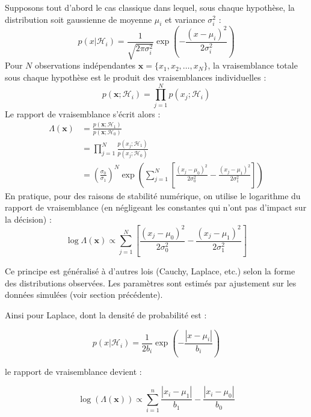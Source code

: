 \documentclass{article}
\begin{document}
Supposons tout d'abord le cas classique dans lequel, sous chaque hypothèse, la distribution soit gaussienne de moyenne $\mu_i$ et variance $\sigma_i^2$ :
\begin{equation}
    p(x|\mathcal{H}_i) = \frac{1}{\sqrt{2\pi\sigma_i^2}} \exp\left(-\frac{(x-\mu_i)^2}{2\sigma_i^2}\right)
\end{equation}
Pour $N$ observations indépendantes $\mathbf{x} = \{x_1, x_2, \ldots, x_N\}$, la vraisemblance totale sous chaque hypothèse est le produit des vraisemblances individuelles :
\begin{equation}
    p(\mathbf{x};\mathcal{H}_i) = \prod_{j=1}^N p(x_j;\mathcal{H}_i)
\end{equation}
Le rapport de vraisemblance s'écrit alors :
\begin{align}
    \Lambda(\mathbf{x}) &= \frac{p(\mathbf{x};\mathcal{H}_1)}{p(\mathbf{x};\mathcal{H}_0)} \\
    &= \prod_{j=1}^N \frac{p(x_j;\mathcal{H}_1)}{p(x_j;\mathcal{H}_0)} \\
    &= \left(\frac{\sigma_0}{\sigma_1}\right)^N \exp\left( \sum_{j=1}^N \left[ \frac{(x_j-\mu_0)^2}{2\sigma_0^2} - \frac{(x_j-\mu_1)^2}{2\sigma_1^2} \right] \right)
\end{align}
En pratique, pour des raisons de stabilité numérique, on utilise le logarithme du rapport de vraisemblance (en négligeant les constantes qui n'ont pas d'impact sur la décision) :
\begin{equation}
    \log \Lambda(\mathbf{x}) \propto \sum_{j=1}^N \left[ \frac{(x_j-\mu_0)^2}{2\sigma_0^2} - \frac{(x_j-\mu_1)^2}{2\sigma_1^2} \right]
\end{equation}

Ce principe est généralisé à d'autres lois (Cauchy, Laplace, etc.) selon la forme des distributions observées. Les paramètres sont estimés par ajustement sur les données simulées (voir section précédente).

Ainsi pour Laplace, dont la densité de probabilité est :

\begin{equation}
    p(x|\mathcal{H}_i) = \frac{1}{2b_i} \exp\left(-\frac{|x-\mu_i|}{b_i}\right)
\end{equation}

le rapport de vraisemblance devient :

\begin{equation}
    \log(\Lambda(\mathbf{x})) \propto \sum_{i=1}^{n} \frac{|x_i - \mu_1|}{b_1} - \frac{|x_i - \mu_0|}{b_0}
\end{equation}
\end{document}
